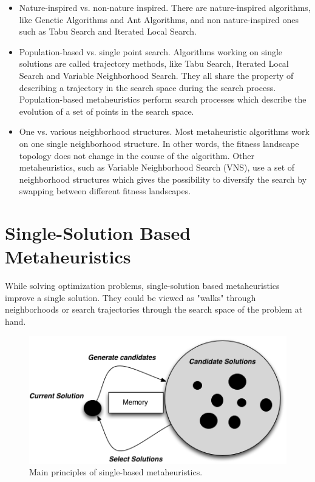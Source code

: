 \begin{itemize}
\item Nature-inspired vs. non-nature inspired. There are nature-inspired algorithms, like Genetic Algorithms and Ant Algorithms, and non nature-inspired ones such as Tabu Search and Iterated Local Search. 

\item Population-based vs. single point search. Algorithms working on single solutions are called trajectory methods, like Tabu Search, Iterated Local Search and Variable Neighborhood Search. They all share the property of describing a trajectory in the search space during the search process. Population-based metaheuristics perform search processes which describe the evolution of a set of points in the search space.

\item One vs. various neighborhood structures. Most metaheuristic algorithms work on one single neighborhood structure. In other words, the fitness landscape topology does not change in the course of the algorithm. Other metaheuristics, such as Variable Neighborhood Search (VNS), use a set of neighborhood structures which gives the possibility to diversify the search by swapping between different fitness
landscapes.
\end{itemize}

\section{Single-Solution Based Metaheuristics}

While solving optimization problems, single-solution based metaheuristics
 improve a single solution. They could be viewed as "walks" through neighborhoods or search trajectories through the search space of the problem at hand.
 
 \begin{figure}[h]
\centering
\includegraphics[width=1\textwidth]{./images/singlebased.png}
\caption{ Main principles of single-based metaheuristics.}
\label{fig:singlebased}
\end{figure}


